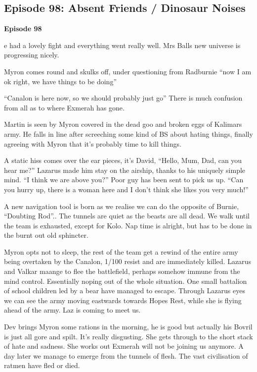 \subsection{Episode 98: Absent Friends / Dinosaur Noises}

\textbf{Episode 98}\medskip

e had a lovely fight and everything went really well. Mrs Balls new universe is progressing nicely.\medskip

Myron comes round and skulks off, under questioning from Radburnie “now I am ok right, we have things to be doing”\medskip

“Canalon is here now, so we should probably just go” There is much confusion from all as to where Exmerah has gone.\medskip

Martin is seen by Myron covered in the dead goo and broken eggs of Kalimars army. He falls in line after screeching some kind of BS about hating things, finally agreeing with Myron that it’s probably time to kill things.\medskip

A static hiss comes over the ear pieces, it's David, “Hello, Mum, Dad, can you hear me?” Lazarus made him stay on the airship, thanks to his uniquely simple mind. “I think we are above you?” Poor guy has been sent to pick us up. “Can you hurry up, there is a woman here and I don’t think she likes you very much!”\medskip

A new navigation tool is born as we realise we can do the opposite of Burnie, “Doubting Rod”.. The tunnels are quiet as the beasts are all dead. We walk until the team is exhausted, except for Kolo. Nap time is alright, but has to be done in the burnt out old sphincter.\medskip

Myron opts not to sleep, the rest of the team get a rewind of the entire army being overtaken by the Canalon, 1/100 resist and are immediately killed. Lazarus and Valkar maange to flee the battlefield, perhaps somehow immune from the mind control. Essentially noping out of the whole situation. One small battalion of school children led by a bear have managed to escape. Through Lazarus eyes we can see the army moving eastwards towards Hopes Rest, while she is flying ahead of the army. Laz is coming to meet us.\medskip

Dev brings Myron some rations in the morning, he is good but actually his Bovril is just all gore and spilt. It's really disgusting. She gets through to the short stack of hate and sadness. She works out Exmerah will not be joining us anymore. A day later we manage to emerge from the tunnels of flesh. The vast civilisation of ratmen have fled or died.\medskip

